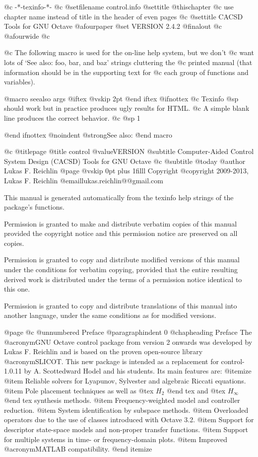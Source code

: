   @c -*-texinfo-*-
@c %
@setfilename control.info
@settitle @thischapter
@c use chapter name instead of title in the header of even pages
@c @settitle CACSD Tools for GNU Octave
@afourpaper
@set VERSION 2.4.2
@finalout
@c @afourwide
@c %


@c The following macro is used for the on-line help system, but we don't
@c want lots of `See also: foo, bar, and baz' strings cluttering the
@c printed manual (that information should be in the supporting text for
@c each group of functions and variables).

@macro seealso {args}
@iftex
@vskip 2pt
@end iftex
@ifnottex
@c Texinfo @sp should work but in practice produces ugly results for HTML.
@c A simple blank line produces the correct behavior. 
@c @sp 1

@end ifnottex
@noindent
@strong{See also:} \args\.
@end macro


@c %
@titlepage
@title control @value{VERSION}
@subtitle Computer-Aided Control System Design (CACSD) Tools for GNU Octave
@c @subtitle @today{}
@author Lukas F. Reichlin
@page
@vskip 0pt plus 1filll
Copyright @copyright{} 2009-2013, Lukas F. Reichlin @email{lukas.reichlin@@gmail.com}

This manual is generated automatically from the texinfo help strings
of the package's functions.

Permission is granted to make and distribute verbatim copies of
this manual provided the copyright notice and this permission notice
are preserved on all copies.

Permission is granted to copy and distribute modified versions of this
manual under the conditions for verbatim copying, provided that the entire
resulting derived work is distributed under the terms of a permission
notice identical to this one.

Permission is granted to copy and distribute translations of this manual
into another language, under the same conditions as for modified versions.


@page
@c @unnumbered Preface
@paragraphindent 0
@chapheading Preface
The @acronym{GNU} Octave control package from version 2 onwards was
developed by Lukas F. Reichlin and is based on the proven open-source
library @acronym{SLICOT}. This new package is intended as a replacement
for control-1.0.11 by A. Scottedward Hodel and his students.
Its main features are:
@itemize
@item Reliable solvers for Lyapunov, Sylvester and algebraic Riccati equations.
@item Pole placement techniques as well as @tex $ H_2 $ @end tex
and @tex $ H_{\infty} $ @end tex
synthesis methods.
@item Frequency-weighted model and controller reduction.
@item System identification by subspace methods.
@item Overloaded operators due to the use of classes introduced with Octave 3.2.
@item Support for descriptor state-space models and non-proper transfer functions.
@item Support for multiple systems in time- or frequency-domain plots.
@item Improved @acronym{MATLAB} compatibility.
@end itemize

